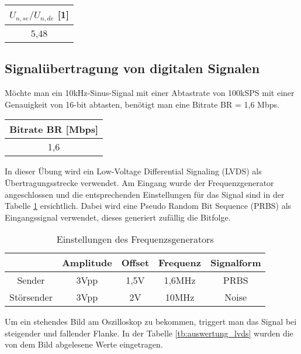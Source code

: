 \begin{table}[!h]
	\centering
	\begin{tabular}{|c|}
		\hline 
		$U_{n, se} / U_{n, de}$ [1]		\\ 
		\hline 
		5,48		\\ 
		\hline 
	\end{tabular}
\end{table}

\subsection{Signalübertragung von digitalen Signalen}

Möchte man ein 10kHz-Sinus-Signal mit einer Abtastrate von 100kSPS mit einer Genauigkeit von 16-bit abtasten, benötigt man eine Bitrate BR = 1,6 Mbps.

\begin{table}[!h]
	\centering
	\begin{tabular}{|c|}
		\hline 
		Bitrate BR [Mbps]		\\ 
		\hline 
		1,6		\\ 
		\hline 
	\end{tabular}
\end{table}

In dieser Übung wird ein Low-Voltage Differential Signaling (LVDS) als Übertragungsstrecke verwendet. Am Eingang wurde der Frequenzgenerator angeschlossen und die entsprechenden Einstellungen für das Signal sind in der Tabelle \ref{tb:einst_lvds} ersichtlich. Dabei wird eine Pseudo Random Bit Sequence (PRBS) als Eingangssignal verwendet, dieses generiert zufällig die Bitfolge.

\begin{table}[!h]
	\centering
	\begin{tabular}{|c|c|c|c|c|}
	\hline 
			& Amplitude		& Offset 	& Frequenz 		& Signalform		\\ 
	\hline 
	Sender	& 3Vpp		& 1,5V	& 1,6MHz		& PRBS		\\ 
	\hline 
	Störsender	& 3Vpp		& 2V		& 10MHz		& Noise 		\\ 
	\hline 
	\end{tabular}
	\caption{Einstellungen des Frequenzsgenerators}
	\label{tb:einst_lvds}
\end{table}

Um ein stehendes Bild am Oszilloskop zu bekommen, triggert man das Signal bei steigender und fallender Flanke. In der Tabelle \ref{tb:auswertung_lvds} wurden die von dem Bild abgelesene Werte eingetragen.

